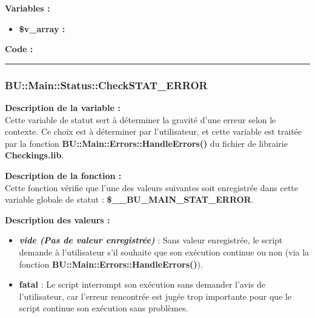 \documentclass[a4paper,10pt]{article}
\begin{document}
\begin{justify}
    \textbf{Variables :}

    \begin{itemize}
        \item \textbf{\color{orange}\$v\_array\color{white} :}
    \end{itemize}
\end{justify}

\begin{justify}
    \textbf{Code :}
\end{justify}



\color{blue}\par\noindent\rule{\textwidth}{0.4pt}\color{white}

\color{blue}
\subsubsection{\color{mauve}BU::Main::Status::CheckSTAT\_ERROR}\color{white}

\begin{justify}
    \textbf{Description de la variable :}\\
    Cette variable de statut sert à déterminer la gravité d'une erreur selon le contexte. Ce choix est à déterminer par l'utilisateur, et cette variable est traitée par la fonction \textbf{\color{mauve}BU::Main::Errors::HandleErrors()} du fichier de librairie \textbf{\color{lime}Checkings.lib}.
\end{justify}

\begin{justify}
    \textbf{Description de la fonction :}\\
        Cette fonction vérifie que l'une des valeurs suivantes soit enregistrée dans cette variable globale de statut : \textbf{\color{orange}\$\_\_BU\_MAIN\_STAT\_ERROR}.
\end{justify}

\begin{justify}
    \textbf{Description des valeurs :}

    \begin{itemize}
        \item \textbf{\textit{vide (Pas de valeur enregistrée)}} : Sans valeur enregistrée, le script demande à l'utilisateur s'il souhaite que son exécution
        continue ou non (via la fonction \textbf{\color{mauve}BU::Main::Errors::HandleErrors()}).\\

        \item \textbf{fatal} : Le script interrompt son exécution sans demander l'avis de l'utilisateur, car l'erreur rencontrée est jugée trop importante pour que le script continue son exécution sans problèmes.
    \end{itemize}

\end{justify}
\end{document}
